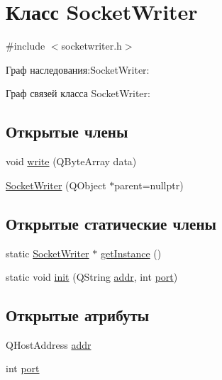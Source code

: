 \hypertarget{class_socket_writer}{}\section{Класс Socket\+Writer}
\label{class_socket_writer}


{\ttfamily \#include $<$socketwriter.\+h$>$}



Граф наследования\+:Socket\+Writer\+:


Граф связей класса Socket\+Writer\+:
\subsection*{Открытые члены}
\begin{DoxyCompactItemize}
\item 
void \hyperlink{class_socket_writer_a64eb590cc3343ca1072ca2896ec9a7ce}{write} (Q\+Byte\+Array data)
\item 
\hyperlink{class_socket_writer_a465ef4c5ff900319f058d82f2305d85e}{Socket\+Writer} (Q\+Object $\ast$parent=nullptr)
\end{DoxyCompactItemize}
\subsection*{Открытые статические члены}
\begin{DoxyCompactItemize}
\item 
static \hyperlink{class_socket_writer}{Socket\+Writer} $\ast$ \hyperlink{class_socket_writer_a071c5c35fb17e082429eb9ebb1fcf5c9}{get\+Instance} ()
\item 
static void \hyperlink{class_socket_writer_a5d43a4e3d17abbaff37887a174ef6c00}{init} (Q\+String \hyperlink{class_socket_writer_aeee2a61724537288bb2cb96d257a24d6}{addr}, int \hyperlink{class_socket_writer_a1fecba79e921d49c9ce5daa97e536121}{port})
\end{DoxyCompactItemize}
\subsection*{Открытые атрибуты}
\begin{DoxyCompactItemize}
\item 
Q\+Host\+Address \hyperlink{class_socket_writer_aeee2a61724537288bb2cb96d257a24d6}{addr}
\item 
int \hyperlink{class_socket_writer_a1fecba79e921d49c9ce5daa97e536121}{port}
\end{DoxyCompactItemize}
